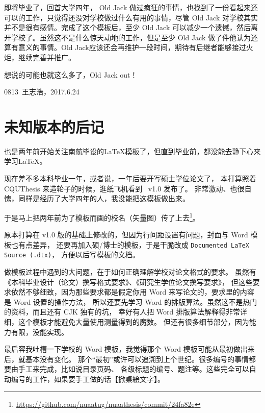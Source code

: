 即将毕业了，回首大学四年， Old Jack 做过疯狂的事情，也找到了一份看起来还可以的工作，只觉得还没对学校做过什么有用的事情，尽管 Old Jack 对学校其实并不是很有感情。完成了这个模板后，至少 Old Jack 可以减少一个遗憾，然后离开学校了。虽然这不是什么惊天动地的工作，但是至少 Old Jack 做了件他认为还算有意义的事情。Old Jack应该还会再维护\nuaathesis 一段时间，期待有后继者能够接过火炬，继续完善并推广\nuaathesis 。

想说的可能也就这么多了，Old Jack out！

\hfill 0813~王志浩，2017.6.24

\section{未知版本的后记}

也是两年前开始关注南航毕设的\LaTeX 模板了，但直到毕业前，都没能去静下心来学习\LaTeX。

现在差不多本科毕业一年，或者说，一年后要开写硕士学位论文了，
本打算照着 CQUThesis 来造轮子的时候，逛纸飞机看到 \nuaathesis~v1.0 发布了。
非常激动、也很自愧，同样是经历了大学四年的人，我没能把这模板做出来。

于是马上把两年前为了模板而画的校名（矢量图）传了上去\footnote{\url{https://github.com/nuaatug/nuaathesis/commit/24fa82e}}。

原本打算在 v1.0 版的基础上修改的，但因为行间距设置有问题，封面与 Word 模板也有点差异，
还要再加入硕/博士的模板，于是干脆改成 \texttt{Documented LaTeX Source (.dtx)}，
方便以后写模板的文档。

做模板过程中遇到的大问题，在于如何正确理解学校对论文格式的要求。
虽然有《本科毕业设计（论文）撰写格式要求》、《研究生学位论文撰写要求》，
但这些要求依然不够细致，因为那些要求都是假定你用 Word 来写论文的，要求里的内容是 Word 设置的操作方法，
所以还要先学习 Word 的排版算法。虽然这不是热门的资料，而且还有 CJK 独有的坑，
幸好有人把 Word 排版算法解释得非常详细，这个模板才能避免大量使用测量得到的魔数。
但还有很多细节部分，因为能力有限，没能实现。

最后容我吐槽一下学校的 Word 模板，我觉得那个 Word 模板可能从最初做出来后，就基本没有变化。
那个“最初”或许可以追溯到上个世纪。很多编号的事情都要由手工来完成，比如说目录页码、
各级标题的编号、题注等。这些完全可以自动编号的工作，如果要手工做的话【掀桌絵文字】。
